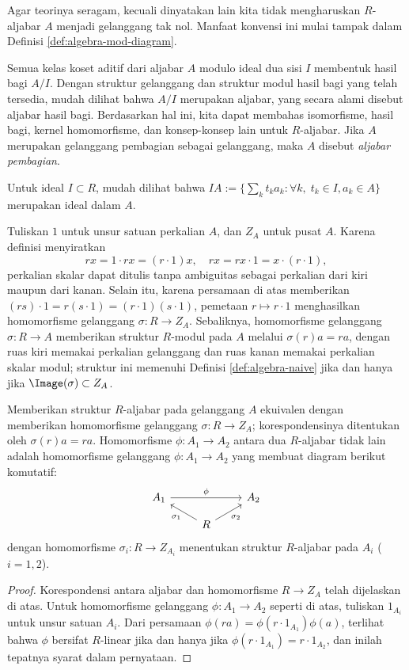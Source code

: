\begin{convention}
	Agar teorinya seragam, kecuali dinyatakan lain kita tidak mengharuskan $R$-aljabar $A$ menjadi gelanggang tak nol. Manfaat konvensi ini mulai tampak dalam Definisi \ref{def:algebra-mod-diagram}.
\end{convention}

Semua kelas koset aditif dari aljabar $A$ modulo ideal dua sisi $I$ membentuk hasil bagi $A/I$. Dengan struktur gelanggang dan struktur modul hasil bagi yang telah tersedia, mudah dilihat bahwa $A/I$ merupakan aljabar, yang secara alami disebut aljabar hasil bagi. Berdasarkan hal ini, kita dapat membahas isomorfisme, hasil bagi, kernel homomorfisme, dan konsep-konsep lain untuk $R$-aljabar. Jika $A$ merupakan gelanggang pembagian sebagai gelanggang, maka $A$ disebut \emph{aljabar pembagian}. 

Untuk ideal $I \subset R$, mudah dilihat bahwa $IA := \{ \sum_k t_k a_k : \forall k, \; t_k \in I, a_k \in A\}$ merupakan ideal dalam $A$.

Tuliskan $1$ untuk unsur satuan perkalian $A$, dan $Z_A$ untuk pusat $A$. Karena definisi menyiratkan
\[ rx = 1 \cdot rx = (r \cdot 1)x, \quad rx = rx \cdot 1 = x \cdot (r \cdot 1), \]
perkalian skalar dapat ditulis tanpa ambiguitas sebagai perkalian dari kiri maupun dari kanan. Selain itu, karena persamaan di atas memberikan $(rs) \cdot 1 = r(s \cdot 1) = (r \cdot 1) (s \cdot 1)$, pemetaan $r \mapsto r \cdot 1$ menghasilkan homomorfisme gelanggang $\sigma: R \to Z_A$. Sebaliknya, homomorfisme gelanggang $\sigma: R \to A$ memberikan struktur $R$-modul pada $A$ melalui $\sigma(r)a = ra$, dengan ruas kiri memakai perkalian gelanggang dan ruas kanan memakai perkalian skalar modul; struktur ini memenuhi Definisi \ref{def:algebra-naive} jika dan hanya jika $\Image(\sigma) \subset Z_A$.

\begin{proposition}\label{prop:algebra-as-homomorphism}
	Memberikan struktur $R$-aljabar pada gelanggang $A$ ekuivalen dengan memberikan homomorfisme gelanggang $\sigma: R \to Z_A$; korespondensinya ditentukan oleh $\sigma(r)a = ra$. Homomorfisme $\phi: A_1 \to A_2$ antara dua $R$-aljabar tidak lain adalah homomorfisme gelanggang $\phi: A_1 \to A_2$ yang membuat diagram berikut komutatif:
	\[\begin{tikzcd}[row sep=small]
		A_1 \arrow[rr, "\phi"] & & A_2 \\
		& R \arrow[lu, "\sigma_1"] \arrow[ru, "\sigma_2"'] &
	\end{tikzcd}\]
	dengan homomorfisme $\sigma_i: R \to Z_{A_i}$ menentukan struktur $R$-aljabar pada $A_i$ ($i=1,2$).
\end{proposition}
\begin{proof}
	Korespondensi antara aljabar dan homomorfisme $R \to Z_A$ telah dijelaskan di atas. Untuk homomorfisme gelanggang $\phi: A_1 \to A_2$ seperti di atas, tuliskan $1_{A_i}$ untuk unsur satuan $A_i$. Dari persamaan $\phi(r a) = \phi(r \cdot 1_{A_1}) \phi(a)$, terlihat bahwa $\phi$ bersifat $R$-linear jika dan hanya jika $\phi(r \cdot 1_{A_1}) = r \cdot 1_{A_2}$, dan inilah tepatnya syarat dalam pernyataan.
\end{proof}

